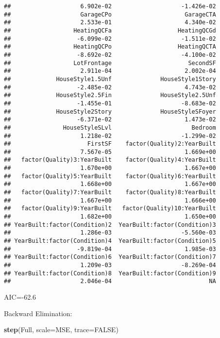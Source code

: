 \documentclass[
]{article}
\newenvironment{Shaded}{\begin{snugshade}}{\end{snugshade}}
\newcommand{\DataTypeTok}[1]{\textcolor[rgb]{0.13,0.29,0.53}{#1}}
\newcommand{\KeywordTok}[1]{\textcolor[rgb]{0.13,0.29,0.53}{\textbf{#1}}}
\newcommand{\NormalTok}[1]{#1}
\newcommand{\OtherTok}[1]{\textcolor[rgb]{0.56,0.35,0.01}{#1}}
\begin{document}
\begin{verbatim}
##                    6.902e-02                    -1.426e-02  
##                    GarageCPo                     GarageCTA  
##                    2.533e-01                     4.340e-02  
##                  HeatingQCFa                   HeatingQCGd  
##                   -6.099e-02                    -1.511e-02  
##                  HeatingQCPo                   HeatingQCTA  
##                   -8.692e-02                    -4.100e-02  
##                  LotFrontage                      SecondSF  
##                    2.911e-04                     2.002e-04  
##             HouseStyle1.5Unf              HouseStyle1Story  
##                   -2.485e-02                     4.743e-02  
##             HouseStyle2.5Fin              HouseStyle2.5Unf  
##                   -1.455e-01                    -8.683e-02  
##             HouseStyle2Story              HouseStyleSFoyer  
##                   -6.371e-02                     1.473e-02  
##               HouseStyleSLvl                       Bedroom  
##                    1.218e-02                    -1.299e-02  
##                      FirstSF    factor(Quality)2:YearBuilt  
##                    7.567e-05                     1.669e+00  
##   factor(Quality)3:YearBuilt    factor(Quality)4:YearBuilt  
##                    1.670e+00                     1.667e+00  
##   factor(Quality)5:YearBuilt    factor(Quality)6:YearBuilt  
##                    1.668e+00                     1.667e+00  
##   factor(Quality)7:YearBuilt    factor(Quality)8:YearBuilt  
##                    1.667e+00                     1.666e+00  
##   factor(Quality)9:YearBuilt   factor(Quality)10:YearBuilt  
##                    1.682e+00                     1.650e+00  
## YearBuilt:factor(Condition)2  YearBuilt:factor(Condition)3  
##                    1.286e-03                    -5.560e-03  
## YearBuilt:factor(Condition)4  YearBuilt:factor(Condition)5  
##                   -9.819e-04                     1.985e-03  
## YearBuilt:factor(Condition)6  YearBuilt:factor(Condition)7  
##                    1.209e-03                    -8.269e-04  
## YearBuilt:factor(Condition)8  YearBuilt:factor(Condition)9  
##                    2.046e-04                            NA
\end{verbatim}

AIC=-62.6

Backward Elimination:

\begin{Shaded}
\begin{Highlighting}[]
\KeywordTok{step}\NormalTok{(Full, }\DataTypeTok{scale=}\NormalTok{MSE, }\DataTypeTok{trace=}\OtherTok{FALSE}\NormalTok{)}
\end{Highlighting}
\end{Shaded}
\end{document}
